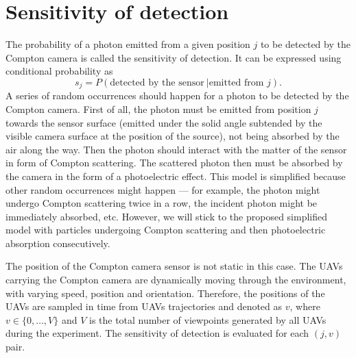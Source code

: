 
\section{Sensitivity of detection}%
\label{sec:sensitivity}
The probability of a photon emitted from a given position $j$ to be detected by the Compton camera is called the sensitivity of detection.
It can be expressed using conditional probability as 
\begin{equation}
  s_{j} =  P(\textrm{detected by the sensor}\ | \textrm{emitted from } j).
\end{equation}
A series of random occurrences should happen for a photon to be detected by the Compton camera.
First of all, the photon must be emitted from position $j$ towards the sensor surface (emitted under the solid angle subtended by the visible camera surface at the position of the source), not being absorbed by the air along the way.
Then the photon should interact with the matter of the sensor in form of Compton scattering.
The scattered photon then must be absorbed by the camera in the form of a photoelectric effect.
This model is simplified because other random occurrences might happen --- for example, the photon might undergo Compton scattering twice in a row, the incident photon might be immediately absorbed, etc.
However, we will stick to the proposed simplified model with particles undergoing Compton scattering and then photoelectric absorption consecutively.

The position of the Compton camera sensor is not static in this case. 
The \ac{UAV}s carrying the Compton camera are dynamically moving through the environment, with varying speed, position and orientation.
Therefore, the positions of the \ac{UAV}s are sampled in time from \ac{UAV}s trajectories and denoted as $v$, where $v \in \{0, \dots , V\}$ and $V$ is the total number of viewpoints generated by all \ac{UAV}s during the experiment.
The sensitivity of detection is evaluated for each $(j,v)$ pair. %

